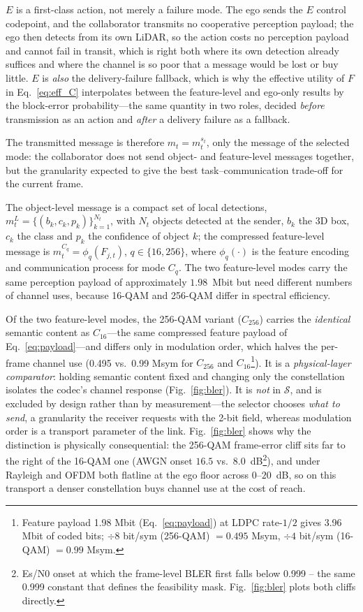 \documentclass[journal]{IEEEtran}
\begin{document}
$E$ is a first-class action, not merely a failure mode. The ego sends the $E$ control codepoint, and the collaborator transmits no cooperative perception payload; the ego then detects from its own LiDAR, so the action costs no perception payload and cannot fail in transit, which is right both where its own detection already suffices and where the channel is so poor that a message would be lost or buy little. $E$ is \emph{also} the delivery-failure fallback, which is why the effective utility of $F$ in Eq.~\eqref{eq:eff_C} interpolates between the feature-level and ego-only results by the block-error probability---the same quantity in two roles, decided \emph{before} transmission as an action and \emph{after} a delivery failure as a fallback.

The transmitted message is therefore $m_t = m_t^{s_t}$, only the message of the selected mode: the collaborator does not send object- and feature-level messages together, but the granularity expected to give the best task--communication trade-off for the current frame.

The object-level message is a compact set of local detections, $m_t^L = \{(b_k, c_k, p_k)\}_{k=1}^{N_t}$, with $N_t$ objects detected at the sender, $b_k$ the 3D box, $c_k$ the class and $p_k$ the confidence of object $k$; the compressed feature-level message is $m_t^{C_q} = \phi_q(F_{j,t})$, $q \in \{16, 256\}$, where $\phi_q(\cdot)$ is the feature encoding and communication process for mode $C_q$. The two feature-level modes carry the same perception payload of approximately $1.98$~Mbit but need different numbers of channel uses, because 16-QAM and 256-QAM differ in spectral efficiency.

Of the two feature-level modes, the 256-QAM variant ($C_{256}$) carries the \emph{identical} semantic content as $C_{16}$---the same compressed feature payload of Eq.~\eqref{eq:payload}---and differs only in modulation order, which halves the per-frame channel use (0.495 vs.\ 0.99 Msym for $C_{256}$ and $C_{16}$\footnote{Feature payload 1.98 Mbit (Eq.~\eqref{eq:payload}) at LDPC rate-$1/2$ gives 3.96 Mbit of coded bits; $\div 8$ bit/sym (256-QAM) $=0.495$ Msym, $\div 4$ bit/sym (16-QAM) $=0.99$ Msym.}). It is a \emph{physical-layer comparator}: holding semantic content fixed and changing only the constellation isolates the codec's channel response (Fig.~\ref{fig:bler}). It is \emph{not} in $\mathcal{S}$, and is excluded by design rather than by measurement---the selector chooses \emph{what to send}, a granularity the receiver requests with the 2-bit field, whereas modulation order is a transport parameter of the link. Fig.~\ref{fig:bler} shows why the distinction is physically consequential: the 256-QAM frame-error cliff sits far to the right of the 16-QAM one (AWGN onset $16.5$ vs.\ $8.0$~dB\footnote{Es/N0 onset at which the frame-level BLER first falls below 0.999 -- the same 0.999 constant that defines the feasibility mask. Fig.~\ref{fig:bler} plots both cliffs directly.}), and under Rayleigh and OFDM both flatline at the ego floor across $0$--$20$~dB, so on this transport a denser constellation buys channel use at the cost of reach.
\end{document}
